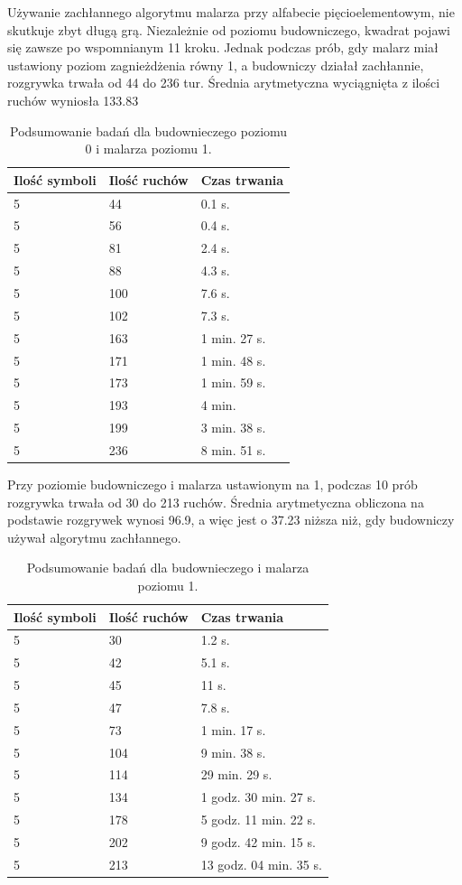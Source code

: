 \documentclass[document]{xmgr}
\begin{document}
Używanie zachłannego algorytmu malarza przy alfabecie pięcioelementowym,  nie skutkuje zbyt długą grą. Niezależnie od poziomu budowniczego, kwadrat pojawi się zawsze po wspomnianym 11 kroku. Jednak podczas prób, gdy malarz miał ustawiony poziom zagnieżdżenia równy 1, a budowniczy działał zachłannie, rozgrywka trwała od 44 do 236 tur. Średnia arytmetyczna wyciągnięta z ilości ruchów wyniosła 133.83

\begin{table}[H]
    \centering
	\begin{tabular}{|l|l|l|} \hline
	Ilość symboli & Ilość ruchów & Czas trwania \\ \hline
	5 & 44 & 0.1 s.\\ \hline
	5 & 56 & 0.4 s.\\ \hline
	5 & 81 & 2.4 s.\\ \hline
	5 & 88 & 4.3 s.\\ \hline
	5 & 100 & 7.6 s.\\ \hline
	5 & 102 & 7.3 s.\\ \hline
	5 & 163 & 1 min. 27 s. \\ \hline
	5 & 171 & 1 min. 48 s. \\ \hline
	5 & 173 & 1 min. 59 s. \\ \hline
	5 & 193 & 4 min. \\ \hline
	5 & 199 & 3 min. 38 s.\\ \hline
	5 & 236 & 8 min. 51 s. \\ \hline
	\end{tabular}
	\caption{Podsumowanie badań dla budownieczego poziomu 0 i malarza poziomu 1.}
	\label{fig:builder0Painter1Table}
\end{table}


Przy poziomie budowniczego i malarza ustawionym na 1, podczas 10 prób rozgrywka trwała od 30 do 213 ruchów. Średnia arytmetyczna obliczona na podstawie rozgrywek wynosi 96.9, a więc jest o 37.23 niższa niż, gdy budowniczy używał algorytmu zachłannego. 

\begin{table}[H]
    \centering
	\begin{tabular}{|l|l|l|} \hline
	Ilość symboli & Ilość ruchów & Czas trwania \\ \hline
	5 & 30 & 1.2 s. \\ \hline	
	5 & 42 & 5.1 s. \\ \hline
	5 & 45 & 11 s. \\ \hline	
	5 & 47 & 7.8 s. \\ \hline
	5 & 73 & 1 min. 17 s. \\ \hline
	5 & 104 & 9 min. 38 s. \\ \hline
	5 & 114 & 29 min. 29 s. \\ \hline
	5 & 134 & 1 godz. 30 min. 27 s.  \\ \hline
	5 & 178 & 5 godz. 11 min. 22 s. \\ \hline
	5 & 202 & 9 godz. 42 min. 15 s. \\ \hline
	5 & 213 & 13 godz. 04 min. 35 s. \\ \hline
	\end{tabular}
	\caption{Podsumowanie badań dla budownieczego i malarza poziomu 1.}
	\label{fig:builder1Painter1Table}
\end{table}
\end{document}
